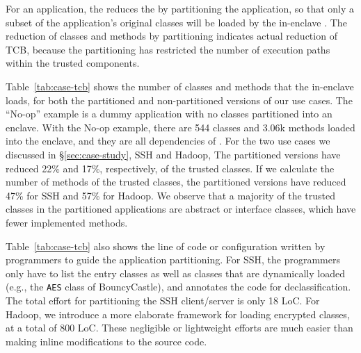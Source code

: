 
For an application, the \sysname{} \dynamicphase{}
reduces the \tcbsize{} by
partitioning the application, so that only a subset of the application's original \java{} classes
will be loaded by the in-enclave \jvm{}.
The reduction of \java{} classes and methods by partitioning indicates
actual reduction of TCB,
because the partitioning has restricted the number of execution paths
within the trusted components.



Table~\ref{tab:case-tcb} shows the number of classes and methods that the in-enclave \jvmname{} \jvm{} loads,
for both the partitioned and non-partitioned versions of our use cases.
The ``No-op'' example is a dummy \java{} application with no classes partitioned into an enclave.
With the No-op example, there are 544 classes and 3.06k methods loaded into the enclave,
and they are all dependencies of \dynamicframework{}.
For the two use cases we discussed in \S\ref{sec:case-study}, SSH and Hadoop,
The partitioned versions have reduced 22\% and 17\%, respectively, of the trusted classes.
If we calculate the number of methods of the trusted classes,
the partitioned versions have reduced 47\% for SSH and 57\% for Hadoop.
We observe that a majority of the trusted classes in the partitioned applications are abstract or interface classes, which have fewer implemented methods.

Table~\ref{tab:case-tcb} also shows the line of code or configuration written by programmers to guide the application partitioning.
For SSH, the programmers only have to list the entry classes
as well as classes that are dynamically loaded (e.g., the {\tt AES} class of BouncyCastle), 
and annotates the code for declassification.
The total effort for partitioning the SSH client/server is only 18 LoC.
For Hadoop, we introduce a more elaborate framework for loading encrypted classes, at a total of 800 LoC.
These negligible or lightweight efforts are much easier than making inline modifications to the source code.



